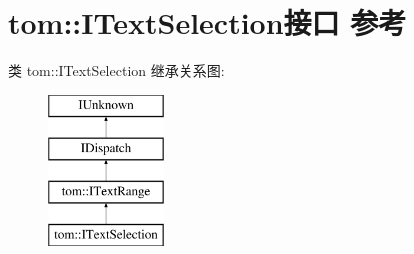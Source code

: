 \hypertarget{interfacetom_1_1_i_text_selection}{}\section{tom\+:\+:I\+Text\+Selection接口 参考}
\label{interfacetom_1_1_i_text_selection}
类 tom\+:\+:I\+Text\+Selection 继承关系图\+:\begin{figure}[H]
\begin{center}
\leavevmode
\includegraphics[height=4.000000cm]{interfacetom_1_1_i_text_selection}
\end{center}
\end{figure}
